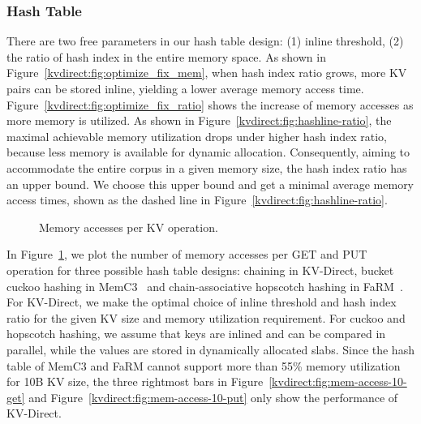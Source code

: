 \subsubsection{Hash Table}
\label{kvdirect:sec:hashtable-eval}

There are two free parameters in our hash table design: (1) inline threshold, (2) the ratio of hash index in the entire memory space.
As shown in Figure~\ref{kvdirect:fig:optimize_fix_mem}, when hash index ratio grows, more KV pairs can be stored inline, yielding a lower average memory access time.
Figure~\ref{kvdirect:fig:optimize_fix_ratio} shows the increase of memory accesses as more memory is utilized.
As shown in Figure~\ref{kvdirect:fig:hashline-ratio}, the maximal achievable memory utilization drops under higher hash index ratio, because less memory is available for dynamic allocation.
Consequently, aiming to accommodate the entire corpus in a given memory size, the hash index ratio has an upper bound.
We choose this upper bound and get a minimal average memory access times, shown as the dashed line in Figure~\ref{kvdirect:fig:hashline-ratio}.

\begin{figure}[t]
\centering
{}

\vfill

\caption{Memory accesses per KV operation.}
\label{kvdirect:fig:mem-access-tput}

\end{figure}

In Figure~\ref{kvdirect:fig:mem-access-tput}, we plot the number of memory accesses per GET and PUT operation for three possible hash table designs: chaining in KV-Direct, bucket cuckoo hashing in MemC3~\cite{fan2013memc3} and chain-associative hopscotch hashing in FaRM~\cite{dragojevic2014farm}.
For KV-Direct, we make the optimal choice of inline threshold and hash index ratio for the given KV size and memory utilization requirement.
For cuckoo and hopscotch hashing, we assume that keys are inlined and can be compared in parallel, while the values are stored in dynamically allocated slabs.
Since the hash table of MemC3 and FaRM cannot support more than 55\% memory utilization for 10B KV size, the three rightmost bars in Figure~\ref{kvdirect:fig:mem-access-10-get} and Figure~\ref{kvdirect:fig:mem-access-10-put} only show the performance of KV-Direct.

